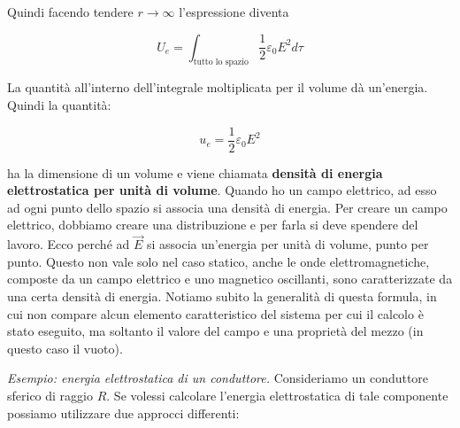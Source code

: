 \begin{figure}[htpb]
\end{figure}
\FloatBarrier

Quindi facendo tendere $ r \to \infty  $ l'espressione diventa

\[
	\boxed{U_e= \int_{\text{tutto lo spazio}}   \frac{1}{2} \varepsilon_0 E^2  d\tau}
\]

La quantità all'interno dell'integrale moltiplicata per il volume dà un'energia. Quindi la quantità:

\[
	\boxed{u_e = \frac{1}{2} \varepsilon_0 E^2}
\]

ha la dimensione di un volume e viene chiamata \textbf{densità di energia elettrostatica per unità di volume}.
Quando ho un campo elettrico, ad esso ad ogni punto dello spazio si associa una densità di energia. Per creare un campo elettrico, dobbiamo creare una distribuzione e per farla si deve spendere del lavoro. Ecco perché ad $\vec{E}$ si associa un'energia per unità di volume, punto per punto. Questo non vale solo nel caso statico, anche le onde elettromagnetiche, composte da un campo elettrico e uno magnetico oscillanti, sono caratterizzate da una certa densità di energia. Notiamo subito la generalità di questa formula, in cui non compare alcun elemento caratteristico del sistema per cui il calcolo è stato eseguito, ma soltanto il valore del campo e una proprietà del mezzo (in questo caso il vuoto).

\emph{Esempio: energia elettrostatica di un conduttore.} Consideriamo un conduttore sferico di raggio $R$. Se volessi calcolare l'energia elettrostatica di tale componente possiamo utilizzare due approcci differenti:

